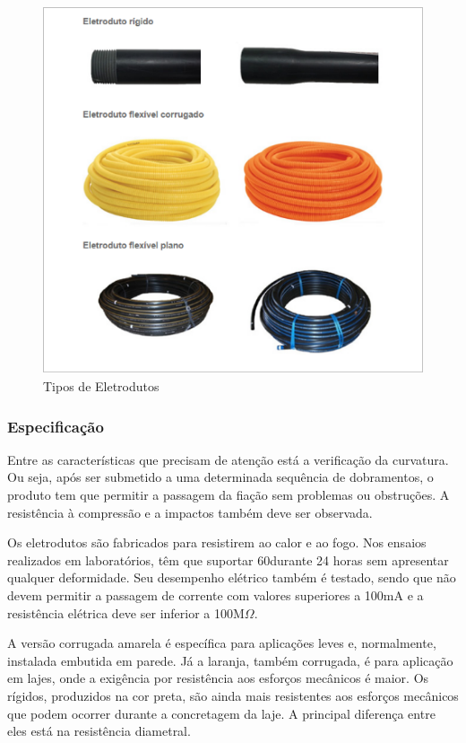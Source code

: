 \begin{figure}[h]
	\centering
	\includegraphics[scale=0.8]		{figuras/eletrodutos.png}
	\caption{Tipos de Eletrodutos}
	\label{alternador}
\end{figure}


\subsubsection{Especificação}

Entre as características que precisam de atenção está a verificação da curvatura. Ou seja, após ser submetido a uma determinada sequência de dobramentos, o produto tem que permitir a passagem da fiação sem problemas ou obstruções. A resistência à compressão e a impactos também deve ser observada.

Os eletrodutos são fabricados para resistirem ao calor e ao fogo. Nos ensaios realizados em laboratórios, têm que suportar 60\celsius durante 24 horas sem apresentar qualquer deformidade. Seu desempenho elétrico também é testado, sendo que não devem permitir a passagem de corrente com valores superiores a 100mA e a resistência elétrica deve ser inferior a 100M$\Omega$.

A versão corrugada amarela é específica para aplicações leves e, normalmente, instalada embutida em parede. Já a laranja, também corrugada, é para aplicação em lajes, onde a exigência por resistência aos esforços mecânicos é maior. Os rígidos, produzidos na cor preta, são ainda mais resistentes aos esforços mecânicos que podem ocorrer durante a concretagem da laje. A principal diferença entre eles está na resistência diametral.

